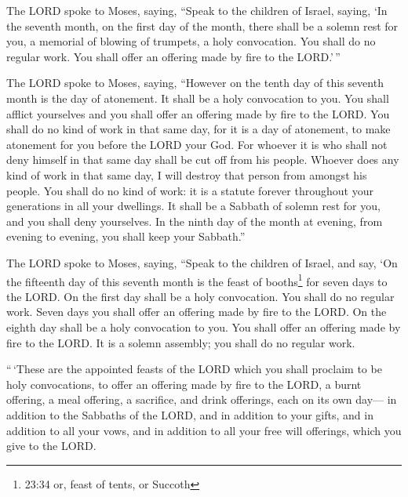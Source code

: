  The LORD spoke to Moses, saying,  ``Speak to
the children of Israel, saying, `In the seventh month, on the first day
of the month, there shall be a solemn rest for you, a memorial of
blowing of trumpets, a holy convocation.  You shall do no
regular work. You shall offer an offering made by fire to the LORD.'\,''

 The LORD spoke to Moses, saying,  ``However
on the tenth day of this seventh month is the day of atonement. It shall
be a holy convocation to you. You shall afflict yourselves and you shall
offer an offering made by fire to the LORD.  You shall do
no kind of work in that same day, for it is a day of atonement, to make
atonement for you before the LORD your God.  For whoever it
is who shall not deny himself in that same day shall be cut off from his
people.  Whoever does any kind of work in that same day, I
will destroy that person from amongst his people.  You
shall do no kind of work: it is a statute forever throughout your
generations in all your dwellings.  It shall be a Sabbath
of solemn rest for you, and you shall deny yourselves. In the ninth day
of the month at evening, from evening to evening, you shall keep your
Sabbath.''

 The LORD spoke to Moses, saying,  ``Speak to
the children of Israel, and say, `On the fifteenth day of this seventh
month is the feast of booths\footnote{23:34 or, feast of tents, or
  Succoth} for seven days to the LORD.  On the first day
shall be a holy convocation. You shall do no regular work. 
Seven days you shall offer an offering made by fire to the LORD. On the
eighth day shall be a holy convocation to you. You shall offer an
offering made by fire to the LORD. It is a solemn assembly; you shall do
no regular work.

 ``\,`These are the appointed feasts of the LORD which you
shall proclaim to be holy convocations, to offer an offering made by
fire to the LORD, a burnt offering, a meal offering, a sacrifice, and
drink offerings, each on its own day---  in addition to the
Sabbaths of the LORD, and in addition to your gifts, and in addition to
all your vows, and in addition to all your free will offerings, which
you give to the LORD.

